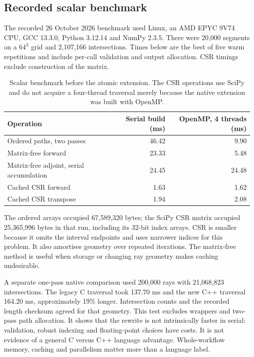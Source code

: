\documentclass[11pt,a4paper]{article}
\begin{document}
\subsection{Recorded scalar benchmark}
The recorded 26 October 2026 benchmark used Linux, an AMD EPYC 9V74 CPU,
GCC 13.3.0, Python 3.12.14 and NumPy 2.3.5. There were 20,000 segments on a
$64^3$ grid and 2,107,166 intersections. Times below are the best of five
warm repetitions and include per-call validation and output allocation.
CSR timings exclude construction of the matrix.
\begin{table}[htbp]
\centering\small
\begin{tabular}{@{}lrr@{}}
\toprule
Operation & Serial build (ms) & OpenMP, 4 threads (ms) \\
\midrule
Ordered paths, two passes & 46.42 & 9.90 \\
Matrix-free forward & 23.33 & 5.48 \\
Matrix-free adjoint, serial accumulation & 24.45 & 24.48 \\
Cached CSR forward & 1.63 & 1.62 \\
Cached CSR transpose & 1.94 & 2.08 \\
\bottomrule
\end{tabular}
\caption{Scalar benchmark before the atomic extension. The CSR operations
use SciPy and do not acquire a four-thread traversal merely because the
native extension was built with OpenMP.}
\end{table}
The ordered arrays occupied 67,589,320 bytes; the SciPy CSR matrix occupied
25,365,996 bytes in that run, including its 32-bit index arrays. CSR is
smaller because it omits the interval endpoints and uses narrower indices
for this problem. It also amortises geometry over repeated iterations.
The matrix-free method is useful when storage or changing ray geometry
makes caching undesirable.

A separate one-pass native comparison used 200,000 rays with
21,068,823 intersections. The legacy C traversal took 137.70 ms and the new
C++ traversal 164.20 ms, approximately 19\% longer. Intersection counts
and the recorded length checksum agreed for that geometry. This test
excludes wrappers and two-pass path allocation. It shows that the rewrite
is not intrinsically faster in serial: validation, robust indexing and
floating-point choices have costs. It is not evidence of a general C
versus C++ language advantage. Whole-workflow memory, caching and
parallelism matter more than a language label.
\end{document}
